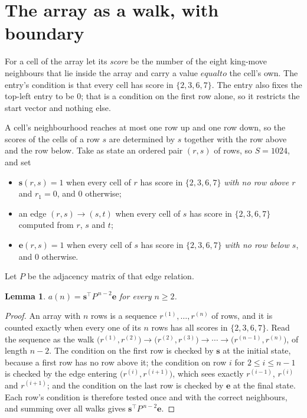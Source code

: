 \documentclass[11pt,a4paper]{article}
\theoremstyle{plain}
\newtheorem{lemma}[theorem]{Lemma}
\theoremstyle{definition}
\begin{document}
\section{The array as a walk, with boundary}

For a cell of the array let its \emph{score} be the number of the eight king-move neighbours that lie inside
the array and carry a value $equal to$ the cell's own. The entry's condition is that every cell
has score in $\{2,3,6,7\}$. The entry also fixes the top-left entry to be $0$; that is a condition on the first row alone, so it restricts the start vector and nothing else.

A cell's neighbourhood reaches at most one row up and one row down, so the scores of the
cells of a row $s$ are determined by $s$ together with the row above and the row below.
Take as state an ordered pair $(r,s)$ of rows, so $S=1024$, and set
\begin{itemize}
\item $\mathbf{s}(r,s)=1$ when every cell of $r$ has score in $\{2,3,6,7\}$ \emph{with no row
above $r$} and $r_1=0$, and $0$ otherwise;
\item an edge $(r,s)\to(s,t)$ when every cell of $s$ has score in $\{2,3,6,7\}$ computed from
$r$, $s$ and $t$;
\item $\mathbf{e}(r,s)=1$ when every cell of $s$ has score in $\{2,3,6,7\}$ \emph{with no row
below $s$}, and $0$ otherwise.
\end{itemize}
Let $P$ be the adjacency matrix of that edge relation.

\begin{lemma}\label{lem:walk}
$a(n)=\mathbf{s}^{\!\top}P^{\,n-2}\mathbf{e}$ for every $n\ge2$.
\end{lemma}

\begin{proof}
An array with $n$ rows is a sequence $r^{(1)},\dots,r^{(n)}$ of rows, and it is counted
exactly when every one of its $n$ rows has all scores in $\{2,3,6,7\}$. Read the sequence as the
walk $\bigl(r^{(1)},r^{(2)}\bigr)\to\bigl(r^{(2)},r^{(3)}\bigr)\to\cdots\to
\bigl(r^{(n-1)},r^{(n)}\bigr)$, of length $n-2$. The condition on the first row is
checked by $\mathbf{s}$ at the initial state, because a first row has no row above it; the
condition on row $i$ for $2\le i\le n-1$ is checked by the edge entering
$\bigl(r^{(i)},r^{(i+1)}\bigr)$, which sees exactly $r^{(i-1)}$, $r^{(i)}$ and
$r^{(i+1)}$; and the condition on the last row is checked by $\mathbf{e}$ at the final
state. Each row's condition is therefore tested once and with the correct neighbours, and
summing over all walks gives $\mathbf{s}^{\!\top}P^{\,n-2}\mathbf{e}$.
\end{proof}
\end{document}
